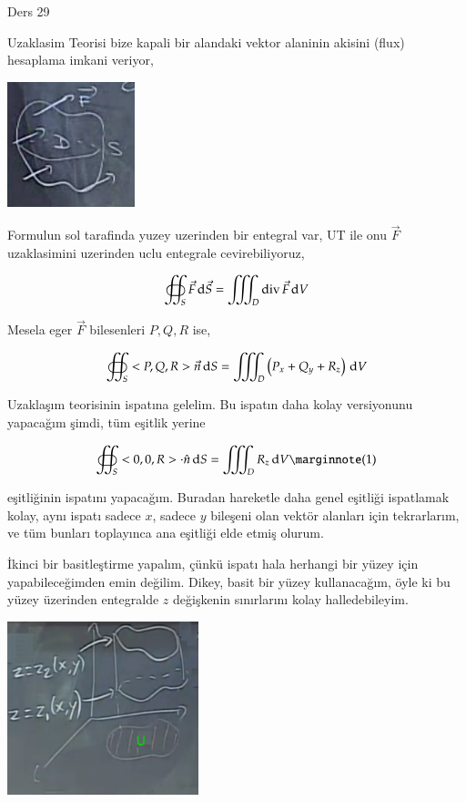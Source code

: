 \documentclass[12pt,fleqn]{article}\usepackage{../../common}
\begin{document}
Ders 29

Uzaklasim Teorisi bize kapali bir alandaki vektor alaninin akisini (flux)
hesaplama imkani veriyor, 

\includegraphics[width=10em]{calc_multi_29_02.jpg}

Formulun sol tarafinda yuzey uzerinden bir entegral var, UT ile onu $\vec{F}$
uzaklasimini uzerinden uclu entegrale cevirebiliyoruz,

$$
\oiint_S \vec{F} \,\mathrm{d} \vec{S} = \iiint_D \operatorname{div} \vec{F} \,\mathrm{d} V
$$

Mesela eger $\vec{F}$ bilesenleri $P,Q,R$ ise,

$$
\oiint_S < P,Q,R > \vec{n} \,\mathrm{d} S = \iiint_D \left( P_x + Q_y + R_z \right) \,\mathrm{d} V
$$



Uzaklaşım teorisinin ispatına gelelim. Bu ispatın daha kolay versiyonunu
yapacağım şimdi, tüm eşitlik yerine

$$
\oiint_S < 0,0,R > \cdot \hat{n} \ud S =
\iiint_D R_z \ud V
\mlabel{1}
$$

eşitliğinin ispatını yapacağım. Buradan hareketle daha genel eşitliği
ispatlamak kolay, aynı ispatı sadece $x$, sadece $y$ bileşeni olan
vektör alanları için tekrarlarım, ve tüm bunları toplayınca ana eşitliği
elde etmiş olurum.

İkinci bir basitleştirme yapalım, çünkü ispatı hala herhangi bir yüzey için
yapabileceğimden emin değilim. Dikey, basit bir yüzey kullanacağım, öyle ki
bu yüzey üzerinden entegralde $z$ değişkenin sınırlarını kolay halledebileyim.

\includegraphics[width=15em]{calc_multi_29_01.png}
\end{document}
